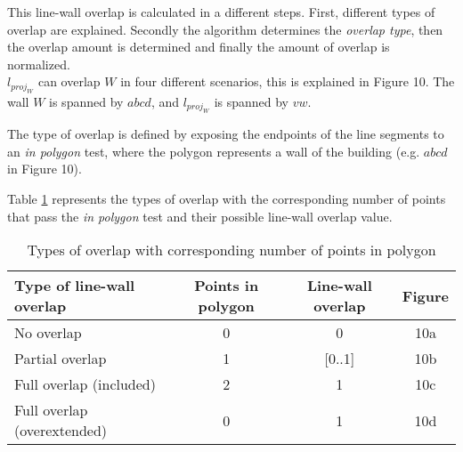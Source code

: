 	This line-wall overlap is calculated in a different steps.
	First, different types of overlap are explained. Secondly the algorithm
	determines the \emph{overlap type}, then the overlap amount is determined and
	finally the amount of overlap is normalized.\\

	$l_{proj_W}$ can overlap $W$ in four different scenarios, this is explained
	in Figure 10. The wall $W$ is spanned by $abcd$, and $l_{proj_W}$ is spanned
	by $vw$.
	
		
	\clearpage


	The type of overlap is defined by exposing the endpoints of the line
	segments to an \emph{in polygon} test, where the polygon represents a 
	wall of the building (e.g. $abcd$ in Figure 10).

	Table \ref{tab:lwatypes} represents the types of overlap with the corresponding number of points
	that pass the \emph{in polygon} test and their possible line-wall overlap
	value.\\ 

	\begin{table}[ht]
		\caption{Types of overlap with corresponding number of points in polygon}
		\label{tab:lwatypes}

		\begin{tabular}{|l||c|c|c|}
		\hline
		Type of line-wall overlap 			&	Points in polygon 			& Line-wall overlap & Figure \\
		\hline
		\hline
		No overlap					&	0					& 0		& 10a\\
		\hline
		Partial overlap 				&	1					& [0..1]	& 10b\\
		\hline
		Full overlap (included)		&	2					& 1		& 10c\\
		\hline
		Full overlap (overextended)		&  	0					& 1 		& 10d\\
		\hline
		\end{tabular}
	\end{table}

